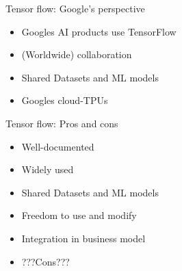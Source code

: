 \begin{frame}{Tensor flow: Google's perspective}
    \begin{itemize}
        \item Googles AI products use TensorFlow
        \item (Worldwide) collaboration
        \item Shared Datasets and ML models
        \item Googles cloud-TPUs
    \end{itemize}
\end{frame}

\begin{frame}{Tensor flow: Pros and cons}
    \begin{itemize}
        \item Well-documented
        \item Widely used
        \item Shared Datasets and ML models
        \item Freedom to use and modify
        \item Integration in business model
        \item ???Cons???
    \end{itemize}
\end{frame}